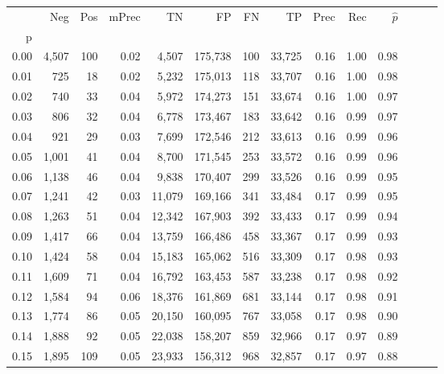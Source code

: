 \begin{tabular}{rrrrrrrrrrrrrr}
\toprule
{} &    Neg &    Pos & mPrec &       TN &       FP &      FN &      TP &  Prec &   Rec & $\hat{p}$ \\
p    &        &        &       &          &          &         &         &       &       &           \\
\midrule
0.00 &  4,507 &    100 &  0.02 &    4,507 &  175,738 &     100 &  33,725 &  0.16 &  1.00 &      0.98 \\
0.01 &    725 &     18 &  0.02 &    5,232 &  175,013 &     118 &  33,707 &  0.16 &  1.00 &      0.98 \\
0.02 &    740 &     33 &  0.04 &    5,972 &  174,273 &     151 &  33,674 &  0.16 &  1.00 &      0.97 \\
0.03 &    806 &     32 &  0.04 &    6,778 &  173,467 &     183 &  33,642 &  0.16 &  0.99 &      0.97 \\
0.04 &    921 &     29 &  0.03 &    7,699 &  172,546 &     212 &  33,613 &  0.16 &  0.99 &      0.96 \\
0.05 &  1,001 &     41 &  0.04 &    8,700 &  171,545 &     253 &  33,572 &  0.16 &  0.99 &      0.96 \\
0.06 &  1,138 &     46 &  0.04 &    9,838 &  170,407 &     299 &  33,526 &  0.16 &  0.99 &      0.95 \\
0.07 &  1,241 &     42 &  0.03 &   11,079 &  169,166 &     341 &  33,484 &  0.17 &  0.99 &      0.95 \\
0.08 &  1,263 &     51 &  0.04 &   12,342 &  167,903 &     392 &  33,433 &  0.17 &  0.99 &      0.94 \\
0.09 &  1,417 &     66 &  0.04 &   13,759 &  166,486 &     458 &  33,367 &  0.17 &  0.99 &      0.93 \\
0.10 &  1,424 &     58 &  0.04 &   15,183 &  165,062 &     516 &  33,309 &  0.17 &  0.98 &      0.93 \\
0.11 &  1,609 &     71 &  0.04 &   16,792 &  163,453 &     587 &  33,238 &  0.17 &  0.98 &      0.92 \\
0.12 &  1,584 &     94 &  0.06 &   18,376 &  161,869 &     681 &  33,144 &  0.17 &  0.98 &      0.91 \\
0.13 &  1,774 &     86 &  0.05 &   20,150 &  160,095 &     767 &  33,058 &  0.17 &  0.98 &      0.90 \\
0.14 &  1,888 &     92 &  0.05 &   22,038 &  158,207 &     859 &  32,966 &  0.17 &  0.97 &      0.89 \\
0.15 &  1,895 &    109 &  0.05 &   23,933 &  156,312 &     968 &  32,857 &  0.17 &  0.97 &      0.88 \\

\end{tabular}

